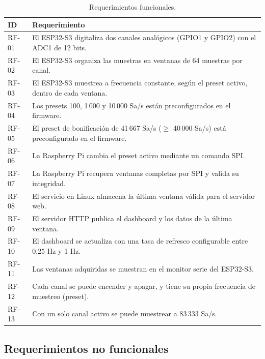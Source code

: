 \documentclass[12pt,a4paper]{article}
\begin{document}
\begin{table}[H]
\centering
\small
\begin{tabular}{@{}p{1.6cm} p{10.5cm}@{}}
\toprule
\textbf{ID} & \textbf{Requerimiento} \\
\midrule
RF-01 & El ESP32-S3 digitaliza dos canales analógicos (GPIO1 y GPIO2) con el ADC1 de 12 bits. \\
RF-02 & El ESP32-S3 organiza las muestras en ventanas de 64 muestras por canal. \\
RF-03 & El ESP32-S3 muestrea a frecuencia constante, según el preset activo, dentro de cada ventana. \\
RF-04 & Los presets 100, 1\,000 y 10\,000 Sa/s están preconfigurados en el firmware. \\
RF-05 & El preset de bonificación de 41\,667 Sa/s ($\geq$ 40\,000 Sa/s) está preconfigurado en el firmware. \\
RF-06 & La Raspberry Pi cambia el preset activo mediante un comando SPI. \\
RF-07 & La Raspberry Pi recupera ventanas completas por SPI y valida su integridad. \\
RF-08 & El servicio en Linux almacena la última ventana válida para el servidor web. \\
RF-09 & El servidor HTTP publica el dashboard y los datos de la última ventana. \\
RF-10 & El dashboard se actualiza con una tasa de refresco configurable entre 0{,}25 Hz y 1 Hz. \\
RF-11 & Las ventanas adquiridas se muestran en el monitor serie del ESP32-S3. \\
RF-12 & Cada canal se puede encender y apagar, y tiene su propia frecuencia de muestreo (preset). \\
RF-13 & Con un solo canal activo se puede muestrear a 83\,333 Sa/s. \\
\bottomrule
\end{tabular}
\caption{Requerimientos funcionales.}
\end{table}

\subsection{Requerimientos no funcionales}
\end{document}
